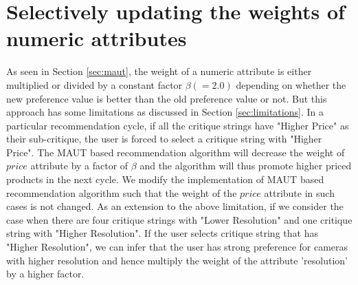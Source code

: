 \section{Selectively updating the weights of numeric attributes}
As seen in Section \ref{sec:maut}, the weight of a numeric attribute is either multiplied or divided by a constant factor $\beta (=2.0)$ depending on whether the new preference value is better than the old preference value or not.
But this approach has some limitations as discussed in Section \ref{sec:limitations}.
In a particular recommendation cycle, if all the critique strings have "Higher Price" as their sub-critique, the user is forced to select a critique string with "Higher Price".
The MAUT based recommendation algorithm will decrease the weight of $price$ attribute by a factor of $\beta$ and the algorithm will thus promote higher priced products in the next cycle.
We modify the implementation of MAUT based recommendation algorithm such that the weight of the $price$ attribute in such cases is not changed.
As an extension to the above limitation, if we consider the case when there are four critique strings with "Lower Resolution" and one critique string with "Higher Resolution". 
If the user selects critique string that has "Higher Resolution", we can infer that the user has strong preference for cameras with higher resolution and hence multiply the weight of the attribute 'resolution' by a higher factor.

